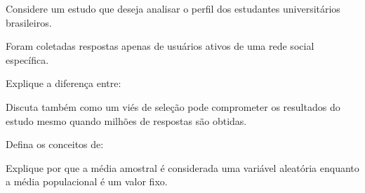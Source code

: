 \documentclass[a4paper, 12pt, addpoints]{exam}
\begin{document}
\begin{questions}
	
	\question[1]
	
	Considere um estudo que deseja analisar o perfil dos estudantes universitários brasileiros.
	
	Foram coletadas respostas apenas de usuários ativos de uma rede social específica.
	
	Explique a diferença entre:
	
	
	Discuta também como um viés de seleção pode comprometer os resultados do estudo mesmo quando milhões de respostas são obtidas.
	\vspace{1cm}
	\question[1]
	
	Defina os conceitos de:
	
	
	Explique por que a média amostral é considerada uma variável aleatória enquanto a média populacional é um valor fixo.
	

\end{questions}
\end{document}
